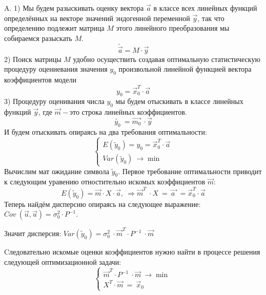 \documentclass[12pt,a4paper]{article}
\begin{document}
\begin{center}
A. 1) Мы будем разыскивать оценку вектора $\displaystyle \vec{a}$ в классе всех линейных функций определённых на векторе значений эндогенной переменной $\displaystyle \vec{y}$, так что определению подлежит матрица $\displaystyle M$ этого линейного преобразования мы собираемся разыскать $\displaystyle M$.
\begin{equation*}
\widetilde{\vec{a}} =M\cdot \vec{y}
\end{equation*}
2) Поиск матрицы $\displaystyle M$ удобно осуществить создавая оптимальную статистическую процедуру оцениевания значения $\displaystyle y_{0}$ произвольной линейной функцией вектора коэффициентов модели
\begin{equation*}
y_{0} =\vec{x}^{T}_{0} \cdot \vec{a}
\end{equation*}
3) Процедуру оценивания числа $\displaystyle y_{0}$ мы будем отыскивать в классе линейных функций $\displaystyle \vec{y}$, где $\displaystyle \vec{m} -$это строка линейных коэффициентов.
\begin{equation*}
\widetilde{y_{0}} \ =\overrightarrow{m_{0}} \ \cdot \vec{y}
\end{equation*}
И будем отыскивать опираясь на два требования оптимальности:
\begin{equation*}
\begin{cases}
E\left(\tilde{y}_{0}\right) =y_{0} =\vec{x}^{T}_{0} \cdot \vec{a}\\
Var\left(\tilde{y}_{0}\right) \ \rightarrow \min
\end{cases}
\end{equation*}
Вычислим мат ожидание символа $\displaystyle \tilde{y}_{0}$. Первое требование оптимальности приводит к следующим уравению отностительно искомых коэффициентов $\displaystyle \vec{m}$:
\begin{equation*}
E\left(\tilde{y}_{0}\right) =\vec{m} \cdot X\cdot \vec{a} ,\ \Rightarrow \vec{m}^{T} \ \cdot X\ =\ \overrightarrow{a\ } \ =\vec{x}^{T}_{0} \cdot \vec{a}
\end{equation*}
Теперь найдём дисперсию опираясь на следующее выражение: $\displaystyle Cov\ \left(\vec{u} ,\vec{u}\right) =\sigma ^{2}_{0} \cdot P^{-1}$.

Значит дисперсия: $\displaystyle Var\left(\tilde{y}_{0}\right) =\sigma ^{2}_{0} \ \cdot \vec{m}^{T} \cdot P^{-1} \ \cdot \vec{m}$

Cледовательно искомые оценки коэффициентов нужно найти в процессе решения следующей оптимизационной задачи:
\begin{equation*}
\begin{cases}
\vec{m}^{T} \cdot P^{-1} \ \cdot \vec{m} \ \rightarrow \min\\
X^{T} \cdot \vec{m} \ =\ \vec{x}_{0}
\end{cases}
\end{equation*}
\end{center}
\end{document}
